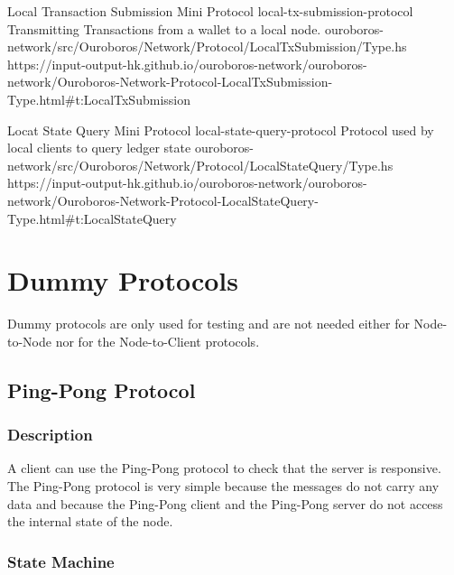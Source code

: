 \miniEntry
    {Local Transaction Submission Mini Protocol}
    {local-tx-submission-protocol}
    {Transmitting Transactions from a wallet to a local node.}
    {ouroboros-network/src/Ouroboros/Network/Protocol/LocalTxSubmission/Type.hs}
    {https://input-output-hk.github.io/ouroboros-network/ouroboros-network/Ouroboros-Network-Protocol-LocalTxSubmission-Type.html\#t:LocalTxSubmission}

\miniEntry
    {Locat State Query Mini Protocol}
    {local-state-query-protocol}
    {Protocol used by local clients to query ledger state}
    {ouroboros-network/src/Ouroboros/Network/Protocol/LocalStateQuery/Type.hs}
    {https://input-output-hk.github.io/ouroboros-network/ouroboros-network/Ouroboros-Network-Protocol-LocalStateQuery-Type.html\#t:LocalStateQuery}


\section{Dummy Protocols}
Dummy protocols are only used for testing and are not needed either for
Node-to-Node nor for the Node-to-Client protocols.
\subsection{Ping-Pong Protocol}
\label{ping-pong-protocol}
\newcommand{\Ping}{\msg{Ping}}
\newcommand{\Pong}{\msg{Pong}}

\subsubsection{Description}
A client can use the Ping-Pong protocol to check that the server is responsive.
The Ping-Pong protocol is very simple because the messages do not carry any data and
because the Ping-Pong client and the Ping-Pong server do not access the internal state of the node.

\subsubsection{State Machine}

